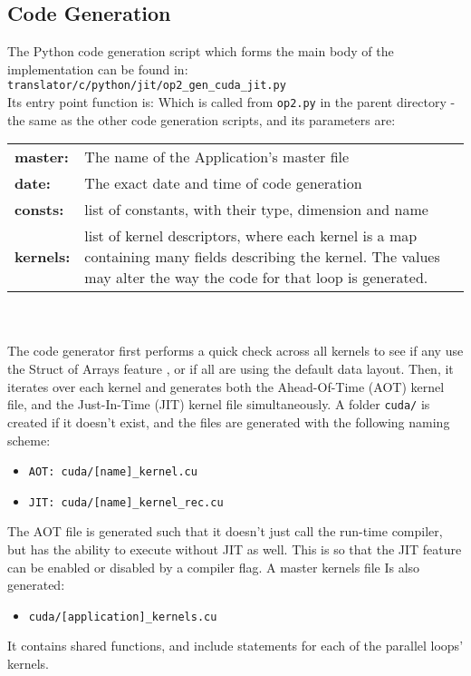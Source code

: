 \subsection{Code Generation}
\label{ss:codegen}
The Python code generation script which forms the main body of the implementation can be found in: \verb|translator/c/python/jit/op2_gen_cuda_jit.py|
\\
Its entry point function is:
Which is called from \verb|op2.py| in the parent directory - the same as the other code generation scripts, and its parameters are:\\
\begin{tabular}{>{\bfseries}l l}
  master: & The name of the Application's master file \\
  date: & The exact date and time of code generation \\
  consts: & list of constants, with their type, dimension and name \\
  kernels: & \parbox[t]{.8\textwidth}{list of kernel descriptors, where each kernel is a map containing many fields describing the kernel. The values may alter the way the code for that loop is generated.}
\end{tabular}
\\
\\
The code generator first performs a quick check across all kernels to see if any use the Struct of Arrays feature \cite[p13]{manual}, or if all are using the default data layout. Then, it iterates over each kernel and generates both the Ahead-Of-Time (AOT) kernel file, and the Just-In-Time (JIT) kernel file simultaneously. A folder \verb|cuda/| is created if it doesn't exist, and the files are generated with the following naming scheme:
\begin{itemize}
\vspace{-1em}
\item{\verb|AOT: cuda/[name]_kernel.cu|}
\vspace{-1em}
\item{\verb|JIT: cuda/[name]_kernel_rec.cu|}
\end{itemize}
The AOT file is generated such that it doesn't just call the run-time compiler, but has the ability to execute without JIT as well. This is so that the JIT feature can be enabled or disabled by a compiler flag. A master kernels file Is also generated:
\begin{itemize}
\vspace{-1em}
\item{\verb|cuda/[application]_kernels.cu|}
\end{itemize}
It contains shared functions, and include statements for each of the parallel loops' kernels.

